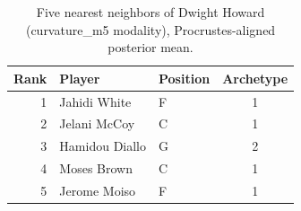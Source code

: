 \begin{table}[htbp]
  \centering\small
  \begin{tabular}{rllc}
    \toprule
    Rank & Player & Position & Archetype \\
    \midrule
    1 & Jahidi White & F & 1 \\
    2 & Jelani McCoy & C & 1 \\
    3 & Hamidou Diallo & G & 2 \\
    4 & Moses Brown & C & 1 \\
    5 & Jerome Moiso & F & 1 \\
    \bottomrule
  \end{tabular}
  \caption{Five nearest neighbors of Dwight Howard (curvature_m5 modality), Procrustes-aligned posterior mean.}
  \label{tab:Dwight_Howard_neighbors_curvature_m5}
\end{table}

